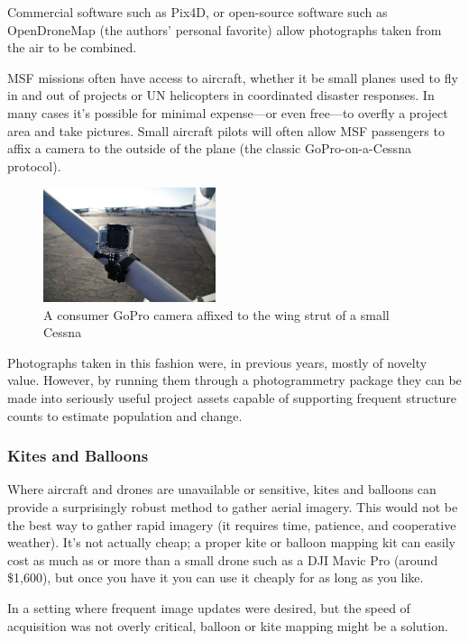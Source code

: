 \documentclass[a4paper,12pt,twoside]{article}
\begin{document}
Commercial software such as Pix4D, or open-source software such as OpenDroneMap (the authors' personal favorite) allow photographs taken from the air to be combined. 

MSF missions often have access to aircraft, whether it be small planes used to fly in and out of projects or UN helicopters in coordinated disaster responses. In many cases it's possible for minimal expense---or even free---to overfly a project area and take pictures. Small aircraft pilots will often allow MSF passengers to affix a camera to the outside of the plane (the classic GoPro-on-a-Cessna protocol).

\begin{figure}[H]
    \centering
    \includegraphics[width=0.45\textwidth]{images/GoPro_Cessna.jpg}
    \caption{A consumer GoPro camera affixed to the wing strut of a small Cessna}
    \label{fig:GoPro Cessna}
\end{figure}

Photographs taken in this fashion were, in previous years, mostly of novelty value. However, by running them through a photogrammetry package they can be made into seriously useful project assets capable of supporting frequent structure counts to estimate population and change.

\subsubsection{Kites and Balloons}
Where aircraft and drones are unavailable or sensitive, kites and balloons can provide a surprisingly robust method to gather aerial imagery. This would not be the best way to gather rapid imagery (it requires time, patience, and cooperative weather). It's not actually cheap; a proper kite or balloon mapping kit can easily cost as much as or more than a small drone such as a DJI Mavic Pro (around \$1,600), but once you have it you can use it cheaply for as long as you like.

In a setting where frequent image updates were desired, but the speed of acquisition was not overly critical, balloon or kite mapping might be a solution.
\end{document}
